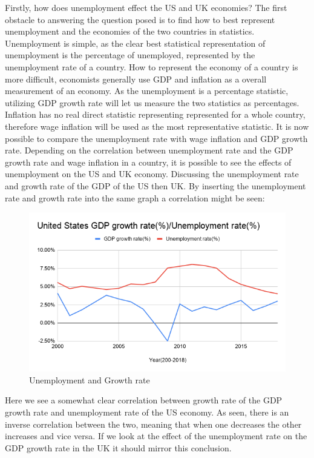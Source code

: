 Firstly, how does unemployment effect the US and UK economies?
The first obstacle to answering the question posed is to find how to best represent unemployment and the economies of the two countries in statistics.
Unemployment is simple, as the clear best statistical representation of unemployment is the percentage of unemployed, represented by the unemployment rate of a country.
How to represent the economy of a country is more difficult, economists generally use GDP and inflation as a overall measurement of an economy.
As the unemployment is a percentage statistic, utilizing GDP growth rate will let us measure the two statistics as percentages.
Inflation has no real direct statistic representing represented for a whole country, therefore wage inflation will be used as the most representative statistic.
It is now possible to compare the unemployment rate with wage inflation and GDP growth rate.
Depending on the correlation between unemployment rate and the GDP growth rate and wage inflation in a country, it is possible to see the effects of unemployment on the US and UK economy.
Discussing the unemployment rate and growth rate of the GDP of the US then UK.
By inserting the unemployment rate and growth rate into the same graph a correlation might be seen: \\

\begin{figure}[H]
   \centering
   \includegraphics[scale = 0.5]{figures/United_States_GDP_Unemployment}
   \caption{Unemployment and Growth rate\cite{US_Unemployment}\cite{US_Growth_Rate_GDP}}
 \end{figure}

Here we see a somewhat clear correlation between growth rate of the GDP growth rate and unemployment rate of the US economy.
As seen, there is an inverse correlation between the two, meaning that when one decreases the other increases and vice versa.
If we look at the effect of the unemployment rate on the GDP growth rate in the UK it should mirror this conclusion. \\

